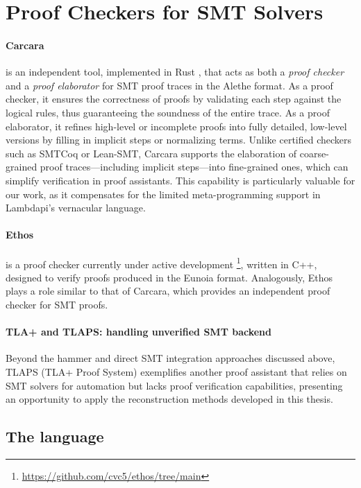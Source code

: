 \section{Proof Checkers for SMT Solvers}

\paragraph{Carcara} \cite{carcara} is an independent tool, implemented in Rust \cite{rust}, that acts as both a \emph{proof checker} and a \emph{proof elaborator} for SMT proof traces in the Alethe format.
As a proof checker, it ensures the correctness of proofs by validating each step against the logical rules, thus guaranteeing the soundness of the entire trace.
As a proof elaborator, it refines high-level or incomplete proofs into fully detailed, low-level versions by filling in implicit steps or normalizing terms.
Unlike certified checkers such as SMTCoq or Lean-SMT, Carcara supports the elaboration of coarse-grained proof traces—including implicit steps—into fine-grained ones, which can simplify verification in proof assistants.
This capability is particularly valuable for our work, as it compensates for the limited meta-programming support in Lambdapi’s vernacular language.

\paragraph{Ethos} is a proof checker currently under active development \footnote{\url{https://github.com/cvc5/ethos/tree/main}}, written in C++, designed to verify proofs produced in the Eunoia format.
Analogously, Ethos plays a role similar to that of Carcara, which provides an independent proof checker for SMT proofs.


\paragraph{TLA+ and TLAPS: handling unverified SMT backend}

Beyond the hammer and direct SMT integration approaches discussed above, TLAPS (TLA+ Proof System) exemplifies another proof assistant that relies on SMT solvers for automation but lacks proof verification capabilities, presenting an opportunity to apply the reconstruction methods developed in this thesis.

\subsection{The language}


